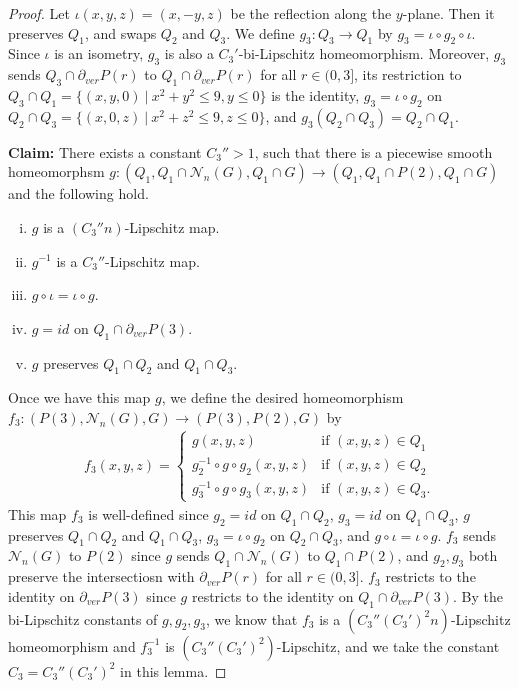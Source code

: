 \documentclass{amsart}
\begin{document}
\begin{proof}
Let $\iota(x,y,z)=(x,-y,z)$ be the reflection along the $y$-plane. Then it preserves $Q_1$, and swaps $Q_2$ and $Q_3$. We define $g_3:Q_3\to Q_1$ by $g_3=\iota\circ g_2\circ \iota$. Since $\iota$ is an isometry, $g_3$ is also a $C_3'$-bi-Lipschitz homeomorphism. Moreover, $g_3$ sends $Q_3\cap \partial_{ver}P(r)$ to  $Q_1\cap \partial_{ver}P(r)$ for all $r\in (0,3]$, its restriction to $Q_3\cap Q_1=\{(x,y,0)\ |\ x^2+y^2\leq 9, y\leq 0\}$ is the identity, $g_3=\iota \circ g_2$ on $Q_2\cap Q_3=\{(x,0,z)\ |\ x^2+z^2\leq 9, z\leq 0\}$, and $g_3(Q_2\cap Q_3)=Q_2\cap Q_1$.

{\bf Claim:} There exists a constant $C_3''>1$, such that there is a piecewise smooth homeomorphsm $g: (Q_1,Q_1\cap \mathcal{N}_n(G),Q_1\cap G)\to  (Q_1,Q_1\cap P(2), Q_1\cap G)$ and the following hold.
\begin{enumerate}[(i)]
\item $g$ is a $(C_3''n)$-Lipschitz map.
\item $g^{-1}$ is a $C_3''$-Lipschitz map.
\item $g\circ \iota=\iota \circ g$.
\item $g=id$ on $Q_1\cap \partial_{ver}P(3)$.
\item $g$ preserves $Q_1\cap Q_2$ and $Q_1\cap Q_3$. 
\end{enumerate}

Once we have this map $g$, we define the desired homeomorphism $f_3:(P(3),\mathcal{N}_n(G),G)\to (P(3),P(2),G)$ by 
\begin{equation*}
\begin{aligned}
f_3(x,y,z)=
\begin{cases}
g(x,y,z)& \text{if\ }(x,y,z)\in Q_1\\
g_2^{-1}\circ g\circ g_2(x,y,z)& \text{if\ }(x,y,z)\in Q_2\\
g_3^{-1}\circ g\circ g_3(x,y,z)& \text{if\ }(x,y,z)\in Q_3.
\end{cases}
\end{aligned}
\end{equation*}
This map $f_3$ is well-defined since $g_2=id$ on $Q_1\cap Q_2$, $g_3=id$ on $Q_1\cap Q_3$, $g$ preserves $Q_1\cap Q_2$ and $Q_1\cap Q_3$, $g_3=\iota\circ g_2$ on $Q_2\cap Q_3$, and $g\circ \iota=\iota \circ g$. $f_3$ sends $\mathcal{N}_n(G)$ to $P(2)$ since $g$ sends $Q_1\cap \mathcal{N}_n(G)$ to $Q_1\cap P(2)$, and $g_2,g_3$ both preserve the intersectiosn with $\partial_{ver}P(r)$ for all $r\in(0,3]$. $f_3$ restricts to the identity on $\partial_{ver}P(3)$ since $g$ restricts to the identity on $Q_1\cap \partial_{ver}P(3)$. By the bi-Lipschitz constants of $g,g_2,g_3$, we know that $f_3$ is a $(C_3''(C_3')^2n)$-Lipschitz homeomorphism and $f_3^{-1}$ is $(C_3''(C_3')^2)$-Lipschitz, and we take the constant $C_3=C_3''(C_3')^2$ in this lemma. 




\end{proof}
\end{document}
